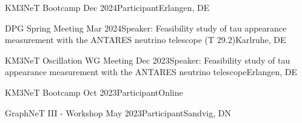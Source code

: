 \documentclass[letterpaper,11pt]{article}
\begin{document}
      \resumeSubheading
      {KM3NeT Bootcamp}
      {Dec 2024}{Participant}{Erlangen, DE}
      
      \resumeSubheading
      {DPG Spring Meeting}
      {Mar 2024}{Speaker: Feasibility study of tau appearance measurement with the ANTARES neutrino telescope (T 29.2)}{Karlruhe, DE}

      \resumeSubheading
      {KM3NeT Oscillation WG Meeting}
      {Dec 2023}{Speaker: Feasibility study of tau appearance measurement with the ANTARES neutrino telescope}{Erlangen, DE}

      \resumeSubheading
      {KM3NeT Bootcamp}
      {Oct 2023}{Participant}{Online}
      
      \resumeSubheading
      {GraphNeT III - Workshop}
      {May 2023}{Participant}{Sandvig, DN}
\resumeSubHeadingListEnd




    
    

\end{document}
